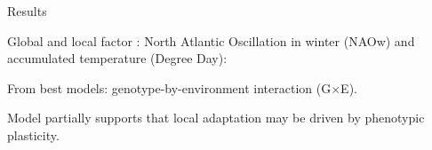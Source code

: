 \documentclass[compress]{beamer}
\begin{document}
\begin{frame}{Results}

Global and local factor : North Atlantic Oscillation in winter (NAOw) and  accumulated temperature (Degree Day):
\vspace{0.3cm}

\begin{table}[!h]
\end{table}

\vspace{0.2cm}
\centering 
\small
From best models: genotype-by-environment interaction (G$\times$E).
\\
\vspace{0.3cm}
\normalsize
\begin{flushleft} 
Model partially supports that local adaptation may be driven by phenotypic plasticity.
\end{flushleft}

\end{frame}
\end{document}

